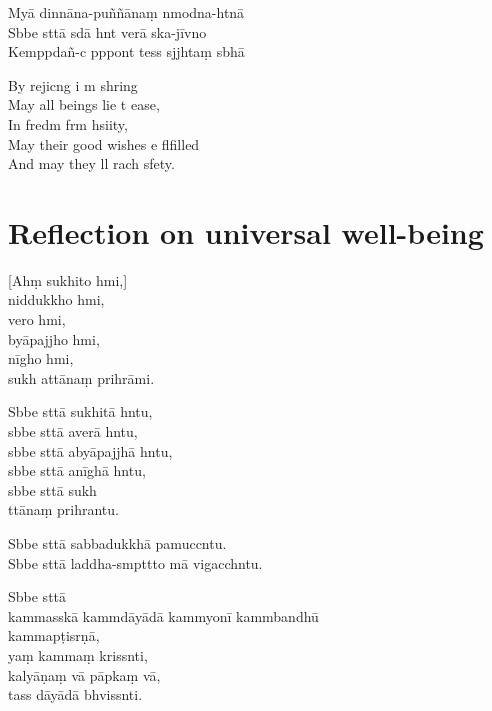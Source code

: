 Myā dinnāna-puññānaṃ nmodna-htnā\\
Sbbe sttā sdā hnt verā ska-jīvno\\
Kemppdañ-c pppont tess sjjhtaṃ sbhā

\begin{english}
  By rejicng i m shring\\
  May all beings lie t ease,\\
  In fredm frm hsiity,\\
  May their good wishes e flfilled\\
  And may they ll rach sfety.
\end{english}

\chapter[Universal well-being]{Reflection on universal well-being}

\begin{leader}
\end{leader}

[Ahṃ sukhito hmi,]\\
niddukkho hmi,\\
vero hmi,\\
byāpajjho hmi,\\
nīgho hmi,\\
sukh attānaṃ prihrāmi.

Sbbe sttā sukhitā hntu,\\
sbbe sttā averā hntu,\\
sbbe sttā abyāpajjhā hntu,\\
sbbe sttā anīghā hntu,\\
sbbe sttā sukh\\
ttānaṃ prihrantu.

Sbbe sttā sabbadukkhā pamuccntu.\\
Sbbe sttā laddha-smpttto mā vigacchntu.

Sbbe sttā\\
kammasskā kammdāyādā kammyonī kammbandhū\\
\vin kammapṭisrṇā,\\
yaṃ kammaṃ krissnti,\\
kalyāṇaṃ vā pāpkaṃ vā,\\
tass dāyādā bhvissnti.

